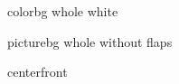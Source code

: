 \documentclass[
    coverwidth=210mm, %
    coverheight=297mm, %
    spinewidth=17.8mm, %
    12pt,
    trimmed=false %
    ]{bookcover}
\begin{document}
\begin{bookcover}


\begin{bookcoverelement}{color}{bg whole}
    white
\end{bookcoverelement}

\begin{bookcoverelement}{picture}{bg whole without flaps}
\end{bookcoverelement}



\begin{bookcoverelement}{center}{front}
\end{bookcoverelement}


\end{bookcover}
\end{document}
